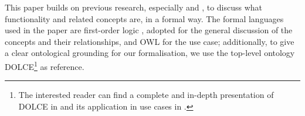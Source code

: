 \documentclass[sw]{iosart2x}
\newcommand{\DOLCE}{\textsc{DOLCE}\xspace} %
\newcommand{\OWL}{\textnormal{OWL}\xspace}
\begin{document}
This paper builds on previous research, especially \cite{borgoCapabilitiesCapacitiesFunctionalities2021} and \cite{mizoguchiUnifyingDefinitionArtifact2016}, to discuss what functionality and related concepts are, in a formal way. 
The formal languages used in the paper are first-order logic \cite{sep-logic-classical}, adopted for the general discussion of the concepts and their relationships, and \OWL \cite{OWL2-QUICK-REFERENCE} for the use case; additionally, to give a clear ontological grounding for our formalisation, we use the top-level ontology \DOLCE\footnote{The interested reader can find a complete and in-depth presentation of \DOLCE in \cite{masoloWonderWebDeliverableD182003} and its application in use cases in \cite{borgoDOLCEDescriptiveOntology2022}.} as reference. 
\end{document}
